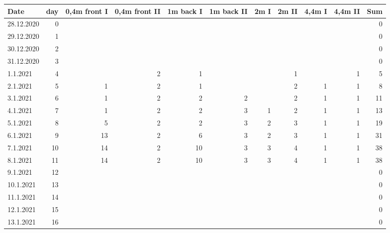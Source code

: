 \documentclass[hyperref]{labbook}
\begin{document}
\begin{table}[H]
\tiny
\begin{tabular}{|l r | rrrrrrrrr|}\hline
Date      &day&0,4m front I&0,4m front II&1m back I&1m back II&2m I&2m II&4,4m I&4,4m II&Sum\\\hline
28.12.2020&0  &            &             &           &            &    &     &      &       &0  \\
29.12.2020&1  &            &             &           &            &    &     &      &       &0  \\
30.12.2020&2  &            &             &           &            &    &     &      &       &0  \\
31.12.2020&3  &            &             &           &            &    &     &      &       &0  \\
1.1.2021  &4  &            &2            &1          &            &    &1    &      &1      &5  \\
2.1.2021  &5  &1           &2            &1          &            &    &2    &1     &1      &8  \\
3.1.2021  &6  &1           &2            &2          &2           &    &2    &1     &1      &11 \\
4.1.2021  &7  &1           &2            &2          &3           &1   &2    &1     &1      &13 \\
5.1.2021  &8  &5           &2            &2          &3           &2   &3    &1     &1      &19 \\
6.1.2021  &9  &13          &2            &6          &3           &2   &3    &1     &1      &31 \\
7.1.2021  &10 &14          &2            &10         &3           &3   &4    &1     &1      &38 \\
8.1.2021  &11 &14          &2            &10         &3           &3   &4    &1     &1      &38 \\
9.1.2021  &12 &            &             &           &            &    &     &      &       &0  \\
10.1.2021 &13 &            &             &           &            &    &     &      &       &0  \\
11.1.2021 &14 &            &             &           &            &    &     &      &       &0  \\
12.1.2021 &15 &            &             &           &            &    &     &      &       &0  \\
13.1.2021 &16 &            &             &           &            &    &     &      &       &0  \\

\end{tabular}
\end{table}
\end{document}
